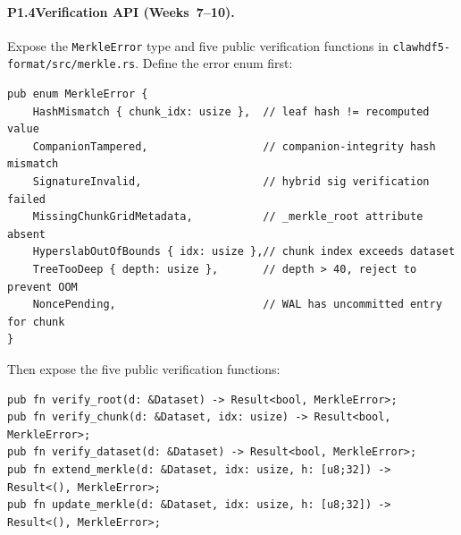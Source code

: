 \documentclass[11pt]{article}
\begin{document}
\paragraph{P1.4\enspace Verification API (Weeks~7--10).}
Expose the \texttt{MerkleError} type and five public verification functions
in \texttt{clawhdf5-format/src/merkle.rs}. Define the error enum first:
\begin{lstlisting}
pub enum MerkleError {
    HashMismatch { chunk_idx: usize },  // leaf hash != recomputed value
    CompanionTampered,                  // companion-integrity hash mismatch
    SignatureInvalid,                   // hybrid sig verification failed
    MissingChunkGridMetadata,           // _merkle_root attribute absent
    HyperslabOutOfBounds { idx: usize },// chunk index exceeds dataset
    TreeTooDeep { depth: usize },       // depth > 40, reject to prevent OOM
    NoncePending,                       // WAL has uncommitted entry for chunk
}
\end{lstlisting}
Then expose the five public verification functions:
\begin{lstlisting}
pub fn verify_root(d: &Dataset) -> Result<bool, MerkleError>;
pub fn verify_chunk(d: &Dataset, idx: usize) -> Result<bool, MerkleError>;
pub fn verify_dataset(d: &Dataset) -> Result<bool, MerkleError>;
pub fn extend_merkle(d: &Dataset, idx: usize, h: [u8;32]) -> Result<(), MerkleError>;
pub fn update_merkle(d: &Dataset, idx: usize, h: [u8;32]) -> Result<(), MerkleError>;
\end{lstlisting}
\end{document}
